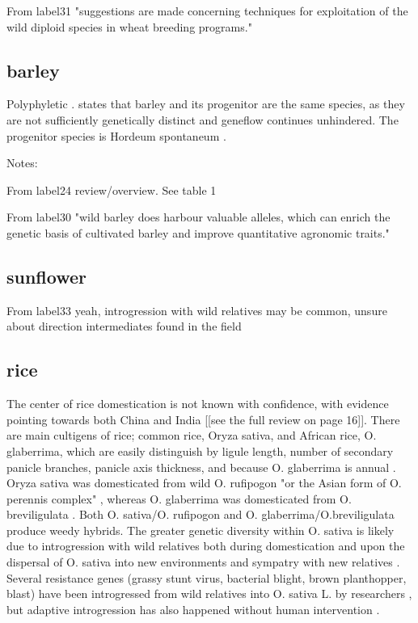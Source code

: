 \documentclass[11pt]{article}
\begin{document}
{From {label31}
"suggestions are made concerning techniques for exploitation of the wild diploid species in wheat breeding programs."

\subsection*{barley}

Polyphyletic \cite{azhaguvel2007phylogenetic}.
\cite{von1995ecogeographical} states that barley and its progenitor are the same species, as they are not sufficiently genetically distinct and geneflow continues unhindered.
The progenitor species is Hordeum spontaneum \cite{oka2012origin}.

Notes:

From {label24}
review/overview.  See table 1

From {label30}
"wild barley does harbour valuable alleles, which can enrich the genetic basis of cultivated barley and improve quantitative agronomic traits."

\subsection*{sunflower}

From {label33}
yeah, introgression with wild relatives may be common, unsure about direction
intermediates found in the field

\subsection*{rice}

The center of rice domestication is not known with confidence, with evidence pointing towards both China and India \cite{oka2012origin} [[see the full review on page 16]].
There are main cultigens of rice; common rice, Oryza sativa, and African rice, O. glaberrima, which are easily distinguish by ligule length, number of secondary panicle branches, panicle axis thickness, and because O. glaberrima is annual \cite{oka2012origin}.
Oryza sativa was domesticated from wild O. rufipogon "or the Asian form of O. perennis complex" \cite{oka2012origin}, whereas O. glaberrima was domesticated from O. breviligulata \cite{oka2012origin}.
Both O. sativa/O. rufipogon and O. glaberrima/O.breviligulata produce weedy hybrids.
The greater genetic diversity within O. sativa is likely due to introgression with wild relatives both during domestication and upon the dispersal of O. sativa into new environments and sympatry with new relatives \cite{second1982origin}.
Several resistance genes (grassy stunt virus, bacterial blight, brown planthopper, blast) have been introgressed from wild relatives into O. sativa L. by researchers \cite{brar1997alien, khush1974inheritance}, but adaptive introgression has also happened without human intervention \cite{second1982origin}.

}
\end{document}
